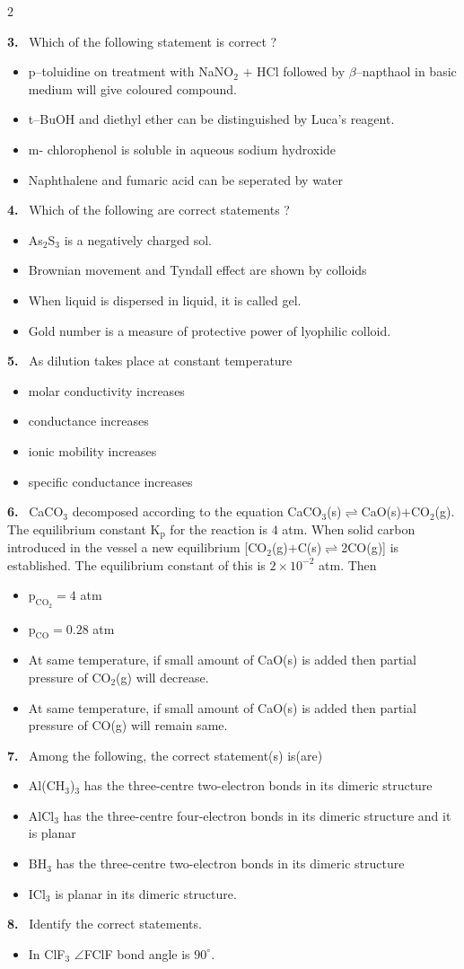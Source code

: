 \documentclass[10pt]{extarticle}
\newcommand{\qn}[1]{\par\smallskip\noindent\textbf{#1.}~}
\newenvironment{qoptions}{\begin{itemize}[leftmargin=1.8em,itemsep=1pt,topsep=2pt,label={}]}{\end{itemize}}
\newcommand{\opt}[2]{\item[(#1)] #2}
\begin{document}
\begin{multicols}{2}
\qn{3} Which of the following statement is correct ?
\begin{qoptions}
\opt{A}{p--toluidine on treatment with NaNO$_2$ $+$ HCl followed by $\beta$--napthaol in basic medium will give coloured compound.}
\opt{B}{t--BuOH and diethyl ether can be distinguished by Luca's reagent.}
\opt{C}{m- chlorophenol is soluble in aqueous sodium hydroxide}
\opt{D}{Naphthalene and fumaric acid can be seperated by water}
\end{qoptions}
\qn{4} Which of the following are correct statements ?
\begin{qoptions}
\opt{A}{As$_2$S$_3$ is a negatively charged sol.}
\opt{B}{Brownian movement and Tyndall effect are shown by colloids}
\opt{C}{When liquid is dispersed in liquid, it is called gel.}
\opt{D}{Gold number is a measure of protective power of lyophilic colloid.}
\end{qoptions}
\qn{5} As dilution takes place at constant temperature
\begin{qoptions}
\opt{A}{molar conductivity increases}
\opt{B}{conductance increases}
\opt{C}{ionic mobility increases}
\opt{D}{specific conductance increases}
\end{qoptions}
\qn{6} CaCO$_3$ decomposed according to the equation CaCO$_3$(s)$\rightleftharpoons$CaO(s)$+$CO$_2$(g). The equilibrium constant K$_\mathrm{p}$ for the reaction is $4$ atm. When solid carbon introduced in the vessel a new equilibrium [CO$_2$(g)$+$C(s)$\rightleftharpoons$2CO(g)] is established. The equilibrium constant of this is $2\times10^{-2}$ atm. Then
\begin{qoptions}
\opt{A}{$\mathrm{p_{CO_2}}=4$ atm}
\opt{B}{$\mathrm{p_{CO}}=0.28$ atm}
\opt{C}{At same temperature, if small amount of CaO(s) is added then partial pressure of CO$_2$(g) will decrease.}
\opt{D}{At same temperature, if small amount of CaO(s) is added then partial pressure of CO(g) will remain same.}
\end{qoptions}
\qn{7} Among the following, the correct statement(s) is(are)
\begin{qoptions}
\opt{A}{Al(CH$_3$)$_3$ has the three-centre two-electron bonds in its dimeric structure}
\opt{B}{AlCl$_3$ has the three-centre four-electron bonds in its dimeric structure and it is planar}
\opt{C}{BH$_3$ has the three-centre two-electron bonds in its dimeric structure}
\opt{D}{ICl$_3$ is planar in its dimeric structure.}
\end{qoptions}
\qn{8} Identify the correct statements.
\begin{qoptions}
\opt{A}{In ClF$_3$ $\angle$FClF bond angle is $90^\circ$.}

\end{qoptions}
\end{multicols}
\end{document}

